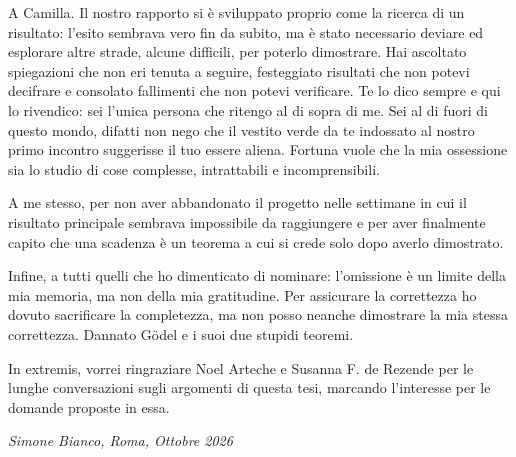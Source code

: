 A Camilla. Il nostro rapporto si è sviluppato proprio come la ricerca di un risultato: l'esito sembrava vero fin da subito, ma è stato necessario deviare ed esplorare altre strade, alcune difficili, per poterlo dimostrare. Hai ascoltato spiegazioni che non eri tenuta a seguire, festeggiato risultati che non potevi decifrare e consolato fallimenti che non potevi verificare. Te lo dico sempre e qui lo rivendico: sei l'unica persona che ritengo al di sopra di me. Sei al di fuori di questo mondo, difatti non nego che il vestito verde da te indossato al nostro primo incontro suggerisse il tuo essere aliena. Fortuna vuole che la mia ossessione sia lo studio di cose complesse, intrattabili e incomprensibili.

A me stesso, per non aver abbandonato il progetto nelle settimane in cui il risultato principale sembrava impossibile da raggiungere e per aver finalmente capito che una scadenza è un teorema a cui si crede solo dopo averlo dimostrato.

Infine, a tutti quelli che ho dimenticato di nominare: l'omissione è un limite della mia memoria, ma non della mia gratitudine. Per assicurare la correttezza ho dovuto sacrificare la completezza, ma non posso neanche dimostrare la mia stessa correttezza. Dannato Gödel e i suoi due stupidi teoremi.

In extremis, vorrei ringraziare Noel Arteche e Susanna F. de Rezende per le lunghe conversazioni sugli argomenti di questa tesi, marcando l'interesse per le domande proposte in essa.

\noindent
\textit{Simone Bianco, Roma, Ottobre 2026}